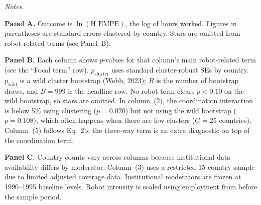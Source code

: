 \documentclass[10pt]{article}
\begin{document}
\endgroup

\vspace{0.6em}
\noindent\begin{minipage}{\linewidth}
\small
\raggedright
\setlength{\parskip}{0.55em}

\noindent\textit{Notes.}

\noindent\textbf{Panel A.}
Outcome is $\ln(\text{H\_EMPE})$, the log of hours worked.
Figures in parentheses are standard errors clustered by country.
Stars are omitted from robot-related terms (see Panel~B).

\noindent\textbf{Panel B.}
Each column shows $p$-values for that column's main robot-related term (see the ``Focal term'' row).
$p_{\text{cluster}}$ uses standard cluster-robust SEs by country.
$p_{\text{wild}}$ is a wild cluster bootstrap (Webb, 2023); $B$ is the number of bootstrap draws, and $B = 999$ is the headline row.
No robot term clears $p < 0.10$ on the wild bootstrap, so stars are omitted.
In column~(2), the coordination interaction is below 5\% using clustering ($p = 0.020$) but not using the wild bootstrap ($p = 0.108$), which often happens when there are few clusters ($G = 25$ countries).
Column~(5) follows Eq.~2b: the three-way term is an extra diagnostic on top of the coordination term.

\noindent\textbf{Panel C.}
Country counts vary across columns because institutional data availability differs by moderator.
Column~(3) uses a restricted 15-country sample due to limited adjusted coverage data.
Institutional moderators are frozen at 1990--1995 baseline levels.
Robot intensity is scaled using employment from before the sample period.

\end{minipage}
\end{document}
